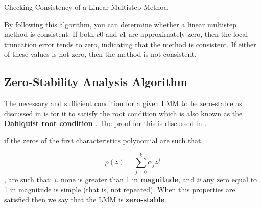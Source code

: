 \documentclass[a4paper, twoside]{report} %
\begin{document}
	\begin{algorithm}
		\caption{Checking Consistency of a Linear Multistep Method}
		\begin{algorithmic}[1] %





		\end{algorithmic}
	\end{algorithm}


	By following this algorithm, you can determine whether a linear multistep method is consistent. If both $c0$ and $c1$ are approximately zero, then the local truncation error tends to zero, indicating that the method is consistent. If either of these values is not zero, then the method is not consistent.


	\subsection{Zero-Stability Analysis Algorithm}
	The necessary and sufficient condition for a given LMM to be zero-stable as discussed in \cite{2022JFatokunEtAl} is for it to satisfy the root condition which is also known as the \textbf{Dahlquist root condition} \cite{lambert1977}. The proof for this is discussed in \cite{keller2020discovery}.

	if the zeros of the first characteristics polynomial are such that


	\begin{equation}
		\rho(z) = \sum_{j=0}^{k}\alpha_jz^{j}
	\end{equation}
	, are such that: \textit{i.} none is greater than 1 in \textbf{magnitude}, and \textit{ii.}any zero equal to 1 in magnitude is simple (that is, not repeated). When this properties are satisfied then we say that the LMM is \textbf{zero-stable}.
\end{document}
